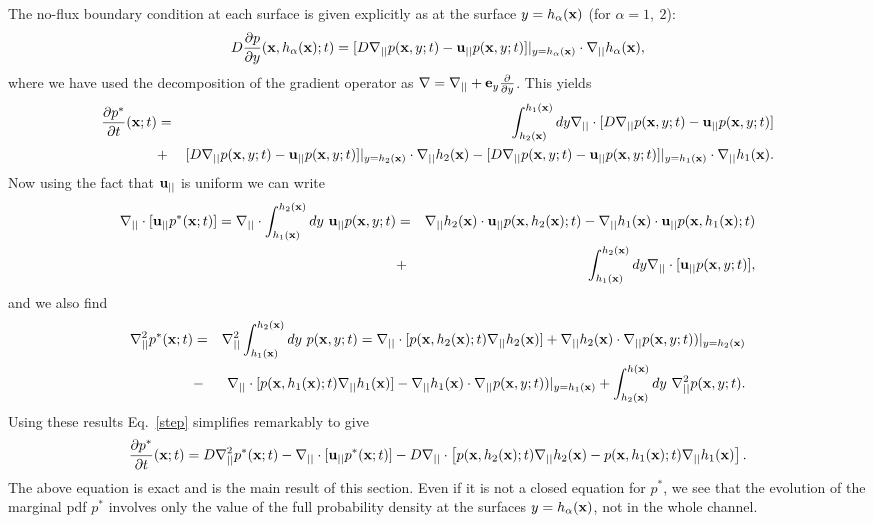 \documentclass[pre,showpacs,preprintnumbers,amsmath,amssymb,superscriptaddress]{revtex4-1}
\begin{document}
The no-flux boundary condition at each surface is given explicitly as at the surface $y=h_{\alpha}({\bf x})$ (for $\alpha = 1,\ 2$):
\begin{equation}
D\frac{\partial p}{\partial y}({\bf x},h_\alpha({\bf x});t) = [D \nabla_{||}p({\bf x},y;t) -{\bf u}_{||} p({\bf x},y;t)]|_{y=h_\alpha({\bf x})} \cdot \nabla_{||}h_\alpha({\bf x}),\label{bc}
\end{equation}
where we have used the decomposition of the gradient operator as $\nabla = \nabla_{||} + {\bf e}_y \frac{\partial}{\partial y}$. This yields
\begin{eqnarray}
\frac{\partial p^*}{\partial t}({\bf x};t) 
&=& \int_{h_2({\bf x})}^{h_1({\bf x})} dy \nabla_{||}\cdot [D\nabla_{||} p({\bf x},y;t) -{\bf u}_{||} p({\bf x},y;t)] \nonumber \\ &+&[D \nabla_{||}p({\bf x},y;t) -{\bf u}_{||} p({\bf x},y;t)]|_{y=h_2({\bf x})}\cdot \nabla_{||}h_2({\bf x}) - [D \nabla_{||}p({\bf x},y;t) -{\bf u}_{||} p({\bf x},y;t)]|_{y=h_1({\bf x})} \cdot \nabla_{||}h_1({\bf x}) .\label{step}
\end{eqnarray}
Now using the fact that ${\bf u}_{||}$ is uniform we can write
\begin{eqnarray}
\nabla_{||} \cdot [ {\bf u}_{||} p^*({\bf x};t)]=\nabla_{||} \cdot \int_{h_1({\bf x})}^{h_2({\bf x})} dy \ {\bf u}_{||} p ({\bf x},y;t)
&=& \nabla_{||} h_2({\bf x})\cdot {\bf u}_{||} p({\bf x},h_2({\bf x});t) - \nabla_{||} h_1({\bf x})\cdot {\bf u}_{||} p({\bf x},h_1({\bf x});t) \nonumber\\&+& \int_{h_1({\bf x})}^{h_2({\bf x})} dy \nabla_{||} \cdot[{\bf u}_{||} p({\bf x},y;t)],
\end{eqnarray}
and we also find
\begin{eqnarray}
\nabla_{||}^2 p^*({\bf x};t)&=&\nabla_{||}^2 \int_{h_1({\bf x})}^{h_2({\bf x})} dy \ p({\bf x},y;t) =  \nabla_{||}\cdot [ p({\bf x},h_2({\bf x});t) \nabla_{||}h_2({\bf x})]+ \nabla_{||}h_2({\bf x})\cdot\nabla_{||}p({\bf x},y;t))|_{y=h_2({\bf x})} \nonumber \\&-&\nabla_{||}\cdot [ p({\bf x},h_1({\bf x});t) \nabla_{||}h_1({\bf x})]-\nabla_{||}h_1({\bf x}) \cdot\nabla_{||}p({\bf x},y;t))|_{y=h_1({\bf x})} + \int_{h_2({\bf x})}^{h({\bf x})} dy\ \nabla_{||} ^2 p({\bf x},y;t).
\end{eqnarray}
Using these results Eq.~\eqref{step} simplifies remarkably to give
\begin{equation}
\frac{\partial p^*}{\partial t}({\bf x};t) = D\nabla_{||}^2 p^*({\bf x};t) - \nabla_{||}\cdot [{\bf u}_{||}
p^*({\bf x};t)] - D\nabla_{||}\cdot \left[p({\bf x}, h_2({\bf x});t) \nabla_{||} h_2({\bf x})-p({\bf x}, h_1({\bf x});t) \nabla_{||} h_1({\bf x})\right].\label{exact}
\end{equation}
The above equation is exact and is the main result of this section. Even if it is not a closed equation for $p^*$, we see  that the evolution of the marginal pdf $p^*$ involves only the value of the full probability density at the surfaces $y= h_\alpha({\bf x})$, not in the whole channel. 
\end{document}
